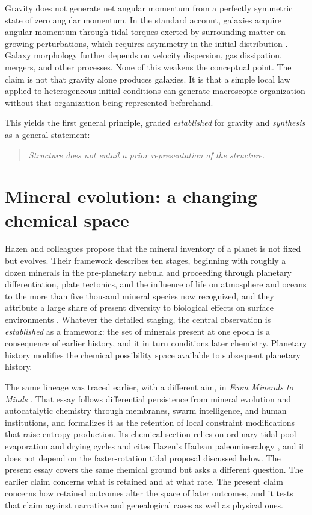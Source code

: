 \documentclass[11pt]{article}
\newenvironment{principle}{\begin{quote}\itshape}{\end{quote}}
\begin{document}
Gravity does not generate net angular momentum from a perfectly symmetric state of zero angular momentum. In the standard account, galaxies acquire angular momentum through tidal torques exerted by surrounding matter on growing perturbations, which requires asymmetry in the initial distribution \cite{peebles,white}. Galaxy morphology further depends on velocity dispersion, gas dissipation, mergers, and other processes. None of this weakens the conceptual point. The claim is not that gravity alone produces galaxies. It is that a simple local law applied to heterogeneous initial conditions can generate macroscopic organization without that organization being represented beforehand.

This yields the first general principle, graded \emph{established} for gravity and \emph{synthesis} as a general statement:
\begin{principle}
Structure does not entail a prior representation of the structure.
\end{principle}

\section{Mineral evolution: a changing chemical space}

Hazen and colleagues propose that the mineral inventory of a planet is not fixed but evolves. Their framework describes ten stages, beginning with roughly a dozen minerals in the pre-planetary nebula and proceeding through planetary differentiation, plate tectonics, and the influence of life on atmosphere and oceans to the more than five thousand mineral species now recognized, and they attribute a large share of present diversity to biological effects on surface environments \cite{hazen2008}. Whatever the detailed staging, the central observation is \emph{established} as a framework: the set of minerals present at one epoch is a consequence of earlier history, and it in turn conditions later chemistry. Planetary history modifies the chemical possibility space available to subsequent planetary history.

The same lineage was traced earlier, with a different aim, in \emph{From Minerals to Minds} \cite{m2m}. That essay follows differential persistence from mineral evolution and autocatalytic chemistry through membranes, swarm intelligence, and human institutions, and formalizes it as the retention of local constraint modifications that raise entropy production. Its chemical section relies on ordinary tidal-pool evaporation and drying cycles and cites Hazen's Hadean paleomineralogy \cite{hazen2013}, and it does not depend on the faster-rotation tidal proposal discussed below. The present essay covers the same chemical ground but asks a different question. The earlier claim concerns what is retained and at what rate. The present claim concerns how retained outcomes alter the space of later outcomes, and it tests that claim against narrative and genealogical cases as well as physical ones.
\end{document}
